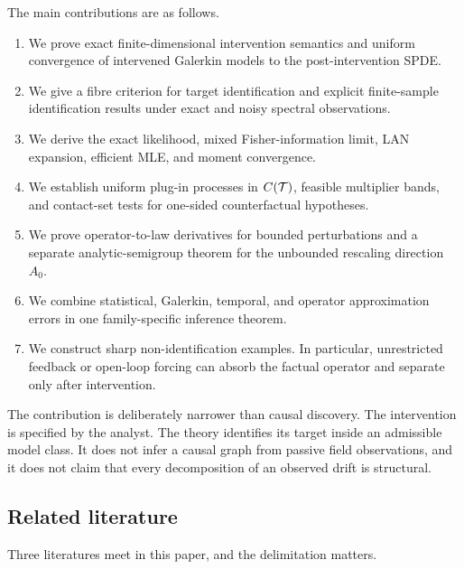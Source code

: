 The main contributions are as follows.

\begin{enumerate}[label=(\roman*)]
\item We prove exact finite-dimensional intervention semantics and uniform convergence of intervened Galerkin models to the post-intervention SPDE.
\item We give a fibre criterion for target identification and explicit finite-sample identification results under exact and noisy spectral observations.
\item We derive the exact likelihood, mixed Fisher-information limit, LAN expansion, efficient MLE, and moment convergence.
\item We establish uniform plug-in processes in $C(\mathcal T)$, feasible multiplier bands, and contact-set tests for one-sided counterfactual hypotheses.
\item We prove operator-to-law derivatives for bounded perturbations and a separate analytic-semigroup theorem for the unbounded rescaling direction $A_0$.
\item We combine statistical, Galerkin, temporal, and operator approximation errors in one family-specific inference theorem.
\item We construct sharp non-identification examples. In particular, unrestricted feedback or open-loop forcing can absorb the factual operator and separate only after intervention.
\end{enumerate}

The contribution is deliberately narrower than causal discovery. The intervention is specified by the analyst. The theory identifies its target inside an admissible model class. It does not infer a causal graph from passive field observations, and it does not claim that every decomposition of an observed drift is structural.

\subsection*{Related literature}

Three literatures meet in this paper, and the delimitation matters.

